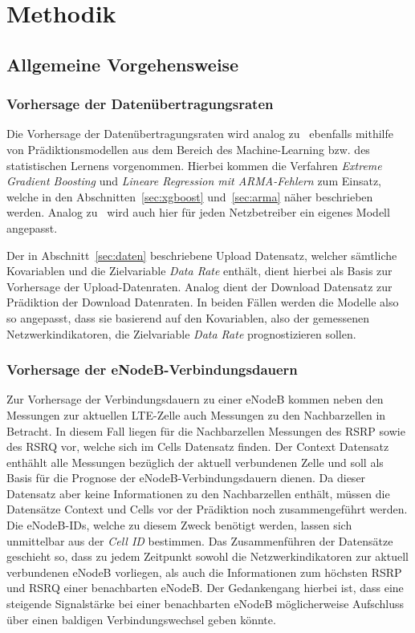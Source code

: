 \section{Methodik}

\subsection{Allgemeine Vorgehensweise}

\subsubsection{Vorhersage der Daten\"ubertragungsraten}

Die Vorhersage der Daten\"ubertragungsraten wird analog zu~\cite{IEEE} ebenfalls mithilfe von
Pr\"adiktionsmodellen aus dem Bereich des Machine-Learning bzw. des statistischen Lernens vorgenommen.
Hierbei kommen die Verfahren \textit{Extreme Gradient Boosting} und \textit{Lineare Regression mit ARMA-Fehlern}
zum Einsatz, welche in den Abschnitten~\ref{sec:xgboost} und~\ref{sec:arma} n\"aher beschrieben werden.
Analog zu~\cite{IEEE} wird auch hier f\"ur jeden Netzbetreiber ein eigenes Modell angepasst.

Der in Abschnitt~\ref{sec:daten} beschriebene Upload Datensatz, welcher s\"amtliche Kovariablen und die Zielvariable
\textit{Data Rate} enth\"alt, dient hierbei als Basis zur Vorhersage der Upload-Datenraten.
Analog dient der Download Datensatz zur Pr\"adiktion der Download Datenraten.
In beiden F\"allen werden die Modelle also so angepasst, dass sie basierend auf den Kovariablen, also der gemessenen Netzwerkindikatoren,
die Zielvariable \textit{Data Rate} prognostizieren sollen.

\subsubsection{Vorhersage der eNodeB-Verbindungsdauern}

Zur Vorhersage der Verbindungsdauern zu einer eNodeB kommen neben den Messungen zur aktuellen LTE-Zelle auch Messungen
zu den Nachbarzellen in Betracht. In diesem Fall liegen f\"ur die Nachbarzellen Messungen des RSRP sowie des RSRQ vor,
welche sich im Cells Datensatz finden. Der Context Datensatz enth\"ahlt alle Messungen bez\"uglich der aktuell verbundenen
Zelle und soll als Basis f\"ur die Prognose der eNodeB-Verbindungsdauern dienen. Da dieser Datensatz aber keine Informationen
zu den Nachbarzellen enth\"alt, m\"ussen die Datens\"atze Context und Cells vor der Pr\"adiktion noch zusammengef\"uhrt werden.
Die eNodeB-IDs, welche zu diesem Zweck ben\"otigt werden, lassen sich unmittelbar aus der \textit{Cell ID} bestimmen.
Das Zusammenf\"uhren der Datens\"atze geschieht so,
dass zu jedem Zeitpunkt sowohl die Netzwerkindikatoren zur aktuell verbundenen eNodeB vorliegen, als auch die
Informationen zum h\"ochsten RSRP und RSRQ einer benachbarten eNodeB.
Der Gedankengang hierbei ist, dass eine steigende Signalst\"arke bei einer benachbarten eNodeB m\"oglicherweise Aufschluss \"uber einen
baldigen Verbindungswechsel geben k\"onnte.

